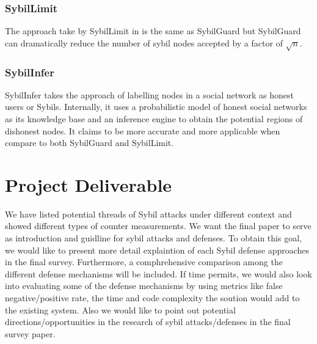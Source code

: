 \documentclass[conference]{IEEEtran}
\begin{document}
\subsubsection{SybilLimit}
The approach take by SybilLimit in \cite{Yu08SybilLimit} is the same as SybilGuard but SybilGuard can dramatically reduce the number of sybil nodes accepted by a factor of  $ \sqrt{n} $.

\subsubsection{SybilInfer}
SybilInfer takes the approach of labelling nodes in a social network as honest users or Sybils. Internally, it uses a probabilistic model of honest social networks as its knowledge base and an inference engine to obtain the potential regions of dishonest nodes.
It claims to be more accurate and more applicable when compare to both SybilGuard and SybilLimit.


\section{Project Deliverable}
We have listed potential threads of Sybil attacks under different context and showed different types of counter measurements. 
We want the final paper to serve as introduction and guidline for sybil attacks and defenses.
To obtain this goal, we would like to present more detail explaintion of each Sybil defense approaches in the final survey. Furthermore, a comphrehensive comparison among the different defense mechanisms will be included.
If time permits, we would also look into evaluating some of the defense mechanisms by using metrics like false negative/positive rate, the time and code complexity the soution would add to the existing system.
Also we would like to point out potential directions/opportunities in the research of sybil attacks/defenses in the final survey paper.

%
%
\end{document}
